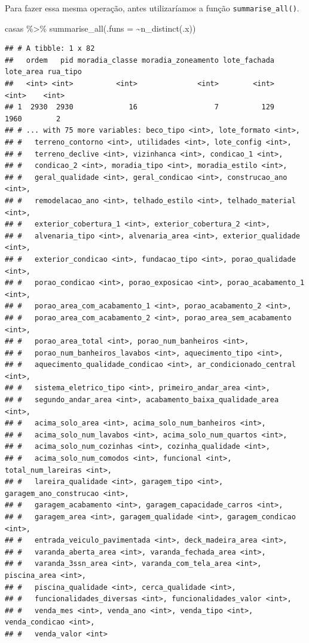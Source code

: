 \documentclass[
]{book}
\newenvironment{Shaded}{\begin{snugshade}}{\end{snugshade}}
\newcommand{\AttributeTok}[1]{\textcolor[rgb]{0.77,0.63,0.00}{#1}}
\newcommand{\FunctionTok}[1]{\textcolor[rgb]{0.00,0.00,0.00}{#1}}
\newcommand{\NormalTok}[1]{#1}
\newcommand{\SpecialCharTok}[1]{\textcolor[rgb]{0.00,0.00,0.00}{#1}}
\begin{document}
Para fazer essa mesma operação, antes utilizaríamos a função \texttt{summarise\_all()}.

\begin{Shaded}
\begin{Highlighting}[]
\NormalTok{casas }\SpecialCharTok{\%\textgreater{}\%} 
  \FunctionTok{summarise\_all}\NormalTok{(}\AttributeTok{.funs =} \SpecialCharTok{\textasciitilde{}}\FunctionTok{n\_distinct}\NormalTok{(.x))}
\end{Highlighting}
\end{Shaded}

\begin{verbatim}
## # A tibble: 1 x 82
##   ordem   pid moradia_classe moradia_zoneamento lote_fachada lote_area rua_tipo
##   <int> <int>          <int>              <int>        <int>     <int>    <int>
## 1  2930  2930             16                  7          129      1960        2
## # ... with 75 more variables: beco_tipo <int>, lote_formato <int>,
## #   terreno_contorno <int>, utilidades <int>, lote_config <int>,
## #   terreno_declive <int>, vizinhanca <int>, condicao_1 <int>,
## #   condicao_2 <int>, moradia_tipo <int>, moradia_estilo <int>,
## #   geral_qualidade <int>, geral_condicao <int>, construcao_ano <int>,
## #   remodelacao_ano <int>, telhado_estilo <int>, telhado_material <int>,
## #   exterior_cobertura_1 <int>, exterior_cobertura_2 <int>,
## #   alvenaria_tipo <int>, alvenaria_area <int>, exterior_qualidade <int>,
## #   exterior_condicao <int>, fundacao_tipo <int>, porao_qualidade <int>,
## #   porao_condicao <int>, porao_exposicao <int>, porao_acabamento_1 <int>,
## #   porao_area_com_acabamento_1 <int>, porao_acabamento_2 <int>,
## #   porao_area_com_acabamento_2 <int>, porao_area_sem_acabamento <int>,
## #   porao_area_total <int>, porao_num_banheiros <int>,
## #   porao_num_banheiros_lavabos <int>, aquecimento_tipo <int>,
## #   aquecimento_qualidade_condicao <int>, ar_condicionado_central <int>,
## #   sistema_eletrico_tipo <int>, primeiro_andar_area <int>,
## #   segundo_andar_area <int>, acabamento_baixa_qualidade_area <int>,
## #   acima_solo_area <int>, acima_solo_num_banheiros <int>,
## #   acima_solo_num_lavabos <int>, acima_solo_num_quartos <int>,
## #   acima_solo_num_cozinhas <int>, cozinha_qualidade <int>,
## #   acima_solo_num_comodos <int>, funcional <int>, total_num_lareiras <int>,
## #   lareira_qualidade <int>, garagem_tipo <int>, garagem_ano_construcao <int>,
## #   garagem_acabamento <int>, garagem_capacidade_carros <int>,
## #   garagem_area <int>, garagem_qualidade <int>, garagem_condicao <int>,
## #   entrada_veiculo_pavimentada <int>, deck_madeira_area <int>,
## #   varanda_aberta_area <int>, varanda_fechada_area <int>,
## #   varanda_3ssn_area <int>, varanda_com_tela_area <int>, piscina_area <int>,
## #   piscina_qualidade <int>, cerca_qualidade <int>,
## #   funcionalidades_diversas <int>, funcionalidades_valor <int>,
## #   venda_mes <int>, venda_ano <int>, venda_tipo <int>, venda_condicao <int>,
## #   venda_valor <int>
\end{verbatim}
\end{document}
